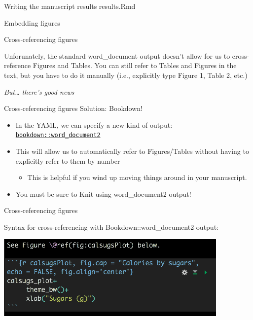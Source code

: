 \documentclass[
  ignorenonframetext,
]{beamer}
\providecommand{\tightlist}{%
  \setlength{\itemsep}{0pt}\setlength{\parskip}{0pt}}
\begin{document}
\begin{frame}[fragile]{Writing the manuscript results \textbar{}
results.Rmd}
\begin{block}{Embedding figures}
\end{block}

\begin{block}{Cross-referencing figures}

Unforunately, the standard word\_document output doesn't allow for us to
cross-reference Figures and Tables. You can still refer to Tables and
Figures in the text, but you have to do it manually (i.e., explicitly
type Figure 1, Table 2, etc.)

\emph{But\ldots{} there's good news}

\end{block}

\begin{block}{Cross-referencing figures \textbar{} Solution: Bookdown!}

\begin{itemize}
\tightlist
\item
  In the YAML, we can specify a new kind of output:
  \href{https://bookdown.org/yihui/bookdown/a-single-document.html}{\texttt{bookdown::word\_document2}}
\item
  This will allow us to automatically refer to Figures/Tables without
  having to explicitly refer to them by number

  \begin{itemize}
  \tightlist
  \item
    This is helpful if you wind up moving things around in your
    manuscript.
  \end{itemize}
\item
  You must be sure to Knit using word\_document2 output!
\end{itemize}

\end{block}

\begin{block}{Cross-referencing figures}

Syntax for cross-referencing with Bookdown::word\_document2 output:

\includegraphics{images/fig_xref.png}


\end{block}
\end{frame}
\end{document}

